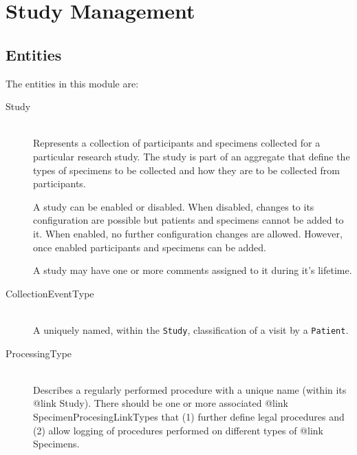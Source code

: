 \chapter{Study Management}

\section{Entities}

The entities in this module are:

\begin{description}

  \item[Study] \hfill \\ Represents a collection of participants and specimens
    collected for a particular research study. The study is part of an
    aggregate that define the types of specimens to be collected and how they
    are to be collected from participants.\par A study can be enabled or
    disabled. When disabled, changes to its configuration are possible but
    patients and specimens cannot be added to it. When enabled, no further
    configuration changes are allowed. However, once enabled participants and
    specimens can be added.\par  A study may have one or more comments assigned to
    it during it's lifetime.

  \item[CollectionEventType] \hfill \\ A uniquely named, within the \texttt{Study},
    classification of a visit by a \texttt{Patient}.

  \item[ProcessingType] \hfill \\ Describes a regularly performed procedure
    with a unique name (within its {@link Study}). There should be one or more
    associated {@link SpecimenProcesingLinkType}s that (1) further define legal
    procedures and (2) allow logging of procedures performed on different types
    of {@link Specimen}s.

  \item[] \hfill \\

  \item[] \hfill \\

  \item[] \hfill \\


\end{description}

